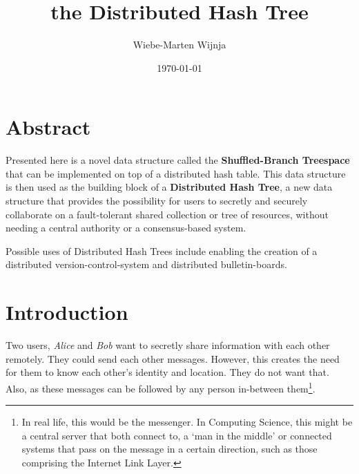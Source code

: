 \documentclass[a4paper]{article}
\begin{document}
\title{the Distributed Hash Tree
}
\date{\today}
\author{Wiebe-Marten Wijnja
}

\maketitle

\section{Abstract}

Presented here is a novel data structure called the \textbf{Shuffled-Branch Treespace} that can be implemented on top of a distributed hash table. This data structure is then used as the building block of a \textbf{Distributed Hash Tree}, a new data structure that provides the possibility for users to secretly and securely collaborate on a fault-tolerant shared collection or tree of resources, without needing a central authority or a consensus-based system.


 Possible uses of Distributed Hash Trees include enabling the creation of a distributed version-control-system and distributed bulletin-boards.



\section{Introduction}

Two users, \textit{Alice} and \textit{Bob} want to secretly share information with each other remotely. They could send each other messages. However, this creates the need for them to know each other's identity and location. They do not want that. Also, as these messages can be followed by any person in-between them\footnote{In real life, this would be the messenger. In Computing Science, this might be a central server that both connect to, a `man in the middle' or  connected systems that pass on the message in a certain direction, such as those comprising the Internet Link Layer.}.\\
\end{document}
